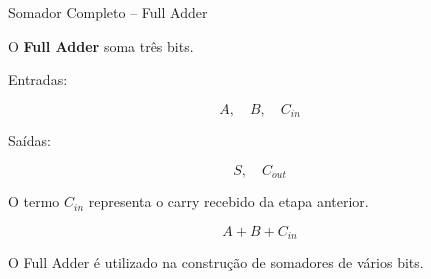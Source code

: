 \begin{frame}{Somador Completo -- Full Adder}

    O \textbf{Full Adder} soma três bits.

    \vspace{0.3cm}

    Entradas:

    \[
        A,\quad B,\quad C_{in}
    \]

    Saídas:

    \[
        S,\quad C_{out}
    \]

    \vspace{0.3cm}

    O termo $C_{in}$ representa o carry recebido da etapa anterior.

    \[
        \boxed{
        A+B+C_{in}
        }
    \]

    O Full Adder é utilizado na construção de somadores de vários bits.

\end{frame}